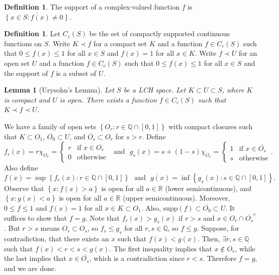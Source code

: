 \documentclass[11pt]{article}
\newtheorem{lemma}[thm]{Lemma}
\theoremstyle{definition}
\newtheorem{defn}[thm]{Definition}
\newcommand{\set}[1]{\left\{ #1 \right\}}
\newcommand{\RR}{\mathbb{R}}
\newcommand{\QQ}{\mathbb{Q}}
\begin{document}
\begin{defn}
The support of a complex-valued function $f$ is $\overline{\set{x\in S:f(x)\neq0}}$.
\end{defn}

\begin{defn}
Let $C_c(S)$ be the set of compactly supported continuous functions on $S$. Write $K\prec
f$ for a compact set $K$ and a function $f\in C_c(S)$ such that $0\le f(x)\le 1$ for all
$x\in S$ and $f(x)=1$ for all $x\in K$. Write $f\prec U$ for an open set $U$ and a function
$f\in C_c(S)$ such that $0\le f(x)\le 1$ for all $x\in S$ and the support of $f$ is a
subset of $U$.
\end{defn}

\begin{lemma}[Urysohn's Lemma]
Let $S$ be a LCH space. Let $K\subset U\subset S$, where $K$ is compact and $U$ is open.
There exists a function $f\in C_c(S)$ such that $K\prec f\prec U$.
\end{lemma}
\proof
We have a family of open sets $\set{O_r:r\in\QQ\cap[0,1]}$ with compact closures such that
$K\subset O_1$, $\overline{O_0}\subset U$, and $\overline{O_s}\subset O_r$ for $s>r$.
Define
\[
f_r(x) = r\chi_{O_r} = \begin{cases}
r&\text{if }x\in O_r \\
0&\text{otherwise}
\end{cases}
~~~\text{and}~~~
g_s(x) = s+(1-s)\chi_{\overline{O_s}} = \begin{cases}
1&\text{if }x\in\overline{O_s} \\
s&\text{otherwise}
\end{cases} .
\]
Also define
\[
f(x)=\sup\set{f_r(x):r\in\QQ\cap[0,1]}
~~~\text{and}~~~
g(x)=\inf\set{g_s(x):s\in\QQ\cap[0,1]} .
\]
Observe that $\set{x:f(x)>a}$ is open for all $a\in\RR$ (lower semicontinuous), and
$\set{x:g(x)<a}$ is open for all $a\in\RR$ (upper semicontinuous). Moreover, $0\le f\le1$
and $f(x)=1$ for all $x\in K\subset O_1$. Also, $\text{supp}(f)\subset \overline{O_0}
\subset U$. It suffices to show that $f=g$. Note that $f_r(x)>g_s(x)$ if $r>s$ and $x\in
O_r\cap\overline{O_s}^c$. But $r>s$ means $O_r\subset O_s$, so $f_r\le g_s$ for all
$r,s\in\QQ$, so $f\le g$. Suppose, for contradiction, that there exists an $x$ such that
$f(x)<g(x)$. Then, $\exists r,s\in\QQ$ such that $f(x)<r<s<g(x)$. The first inequality
implies that $x\notin O_r$, while the last implies that $x\in\overline{O_s}$, which is a
contradiction since $r<s$. Therefore $f=g$, and we are done.
\qedhere
\end{document}
